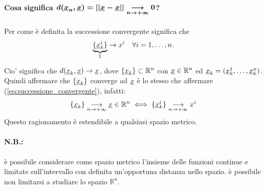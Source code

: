 \paragraph{Cosa significa $\boldsymbol{d(\uline x_n,\uline x)=||\uline x-\uline x||\underset{n\rightarrow+\infty}{\longrightarrow}0}$?} Per come è definita la successione convergente significa che
\begin{equation}\label{eq:successione_convergente}
    \underbrace{\{\uline x_k^i\}}_{\footnotemark}\rightarrow x^i\quad\forall i=1,\hdots,n.
\end{equation}
Cio' significa che $d(\uline x_k,\uline x)\rightarrow\uline x$, dove $\{\uline x_k\}\subset\mathbb R^n$ con $\uline x\in\mathbb R^n$ ed $\uline x_k=(\uline x_k^1,\hdots,\uline x_k^n)$. Quindi affermare che $\{\uline x_k\}$ converge ad $\uline x$ è lo stesso che affermare (\ref{eq:successione_convergente}), infatti:
\begin{equation*}
    \{\uline x_k\}\underset{n\rightarrow+\infty}{\longrightarrow}\uline x\in\mathbb R^n\iff\{\uline x_k^i\}\underset{n\rightarrow+\infty}{\longrightarrow}x^i
\end{equation*}
Questo ragionamento è estendibile a qualsiasi spazio metrico.

\paragraph{N.B.:} è possibile considerare come spazio metrico l'insieme delle funzioni continue e limitate sull'intervallo con definita un'opportuna distanza nello spazio. è possibile non limitarsi a studiare lo spazio $\mathbb R^n$.

